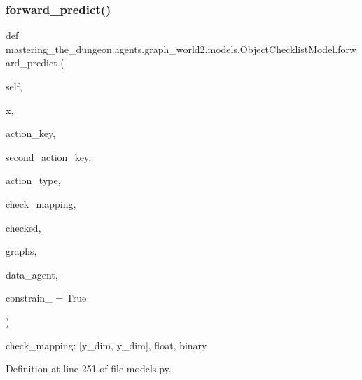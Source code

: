 \subsubsection{\texorpdfstring{forward\+\_\+predict()}{forward\_predict()}}
{\footnotesize\ttfamily def mastering\+\_\+the\+\_\+dungeon.\+agents.\+graph\+\_\+world2.\+models.\+Object\+Checklist\+Model.\+forward\+\_\+predict (\begin{DoxyParamCaption}\item[{}]{self,  }\item[{}]{x,  }\item[{}]{action\+\_\+key,  }\item[{}]{second\+\_\+action\+\_\+key,  }\item[{}]{action\+\_\+type,  }\item[{}]{check\+\_\+mapping,  }\item[{}]{checked,  }\item[{}]{graphs,  }\item[{}]{data\+\_\+agent,  }\item[{}]{constrain\+\_\+ = {\ttfamily True} }\end{DoxyParamCaption})}

\begin{DoxyVerb}check_mapping: [y_dim, y_dim], float, binary
\end{DoxyVerb}
 

Definition at line 251 of file models.\+py.



